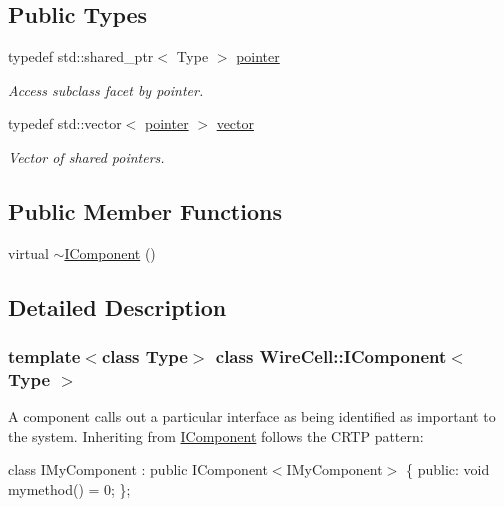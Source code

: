 \subsection*{Public Types}
\begin{DoxyCompactItemize}
\item 
typedef std\+::shared\+\_\+ptr$<$ Type $>$ \hyperlink{class_wire_cell_1_1_i_component_a744b962ee9489c909f1b0f1fe2533798}{pointer}
\begin{DoxyCompactList}\small\item\em Access subclass facet by pointer. \end{DoxyCompactList}\item 
typedef std\+::vector$<$ \hyperlink{class_wire_cell_1_1_i_component_a744b962ee9489c909f1b0f1fe2533798}{pointer} $>$ \hyperlink{class_wire_cell_1_1_i_component_a18978d88ce697af5941655a89660fd4e}{vector}
\begin{DoxyCompactList}\small\item\em Vector of shared pointers. \end{DoxyCompactList}\end{DoxyCompactItemize}
\subsection*{Public Member Functions}
\begin{DoxyCompactItemize}
\item 
virtual \hyperlink{class_wire_cell_1_1_i_component_a3415deca75dbbfae924ad33b8cd364d4}{$\sim$\+I\+Component} ()
\end{DoxyCompactItemize}


\subsection{Detailed Description}
\subsubsection*{template$<$class Type$>$\newline
class Wire\+Cell\+::\+I\+Component$<$ Type $>$}

A component calls out a particular interface as being identified as important to the system. Inheriting from \hyperlink{class_wire_cell_1_1_i_component}{I\+Component} follows the C\+R\+TP pattern\+:

class I\+My\+Component \+: public I\+Component$<$\+I\+My\+Component$>$ \{ public\+: void mymethod() = 0; \};

